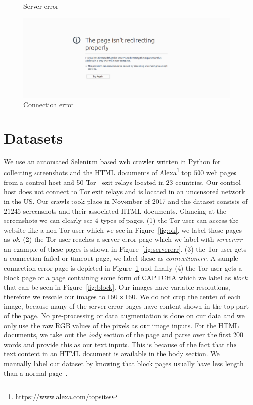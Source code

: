 \documentclass{article} %
\begin{document}
\begin{figure}[!htb]
  \caption{Server error}\label{fig:servererr}
\endminipage
{}%
  \includegraphics[width=\linewidth]{connectionerr.png}
  \caption{Connection error}\label{fig:connectionerr}
\endminipage
\end{figure}
\section{Datasets} 
\label{datasets}
We use an automated Selenium based web crawler written in Python for collecting screenshots and the HTML documents of Alexa\footnote{https://www.alexa.com/topsites} top $500$ web pages from a control host and 50 Tor~\cite{tor} exit relays located in 23 countries. Our control host does not connect to Tor exit relays and is located in an uncensored network in the US. Our crawls took place in November of 2017 and the dataset consists of $21246$ screenshots and their associated HTML documents. Glancing at the screenshots we can clearly see 4 types of pages. (1) the Tor user can access the website like a non-Tor user which we see in Figure~\ref{fig:ok}, we label these pages as \textit{ok}. (2) the Tor user reaches a server error page which we label with \textit{servererr} an example of these pages is shown in Figure~\ref{fig:servererr}. (3) the Tor user gets a connection failed or timeout page, we label these as \textit{connectionerr}. A sample connection error page is depicted in Figure~\ref{fig:connectionerr} and finally (4) the Tor user gets a block page or a page containing some form of CAPTCHA which we label as \textit{block} that can be seen in Figure~\ref{fig:block}.
Our images have variable-resolutions, therefore we rescale our images to $160\times160$. We do not crop the center of each image, because many of the server error pages have content shown in the top part of the page. No pre-processing or data augmentation is done on our data and we only use the raw RGB values of the pixels as our image inputs. For the HTML documents, we take out the \textit{body} section of the page and parse over the first 200 words and provide this as our text inputs. This is because of the fact that the text content in an HTML document is available in the body section. We manually label our dataset by knowing that block pages usually have less length than a normal page~\cite{imc14_phillipa}.
\end{document}
